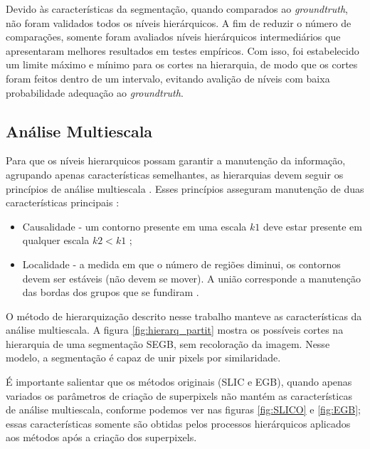 \begin{document}
Devido às características da segmentação, quando comparados ao \textit{groundtruth}, não foram validados todos os níveis hierárquicos. A fim de reduzir o número de comparações, somente foram avaliados níveis hierárquicos intermediários que apresentaram melhores resultados em testes empíricos. Com isso, foi estabelecido um limite máximo e mínimo para os cortes na hierarquia, de modo que os cortes foram feitos dentro de um intervalo, evitando avalição de níveis com baixa probabilidade adequação ao \textit{groundtruth}.


\subsection{Análise Multiescala} \label{ssec:analise_multiescala}

Para que os níveis hierarquicos possam garantir a manutenção da informação, agrupando apenas características semelhantes, as hierarquias devem seguir os princípios de análise multiescala \cite{SILVIO_ZENILTON}. Esses princípios asseguram manutenção de duas características principais \cite{SILVIO_ZENILTON}:

\begin{itemize}
 \item Causalidade - um contorno presente em uma escala $k1$ deve estar presente em qualquer escala $k2 < k1$ \cite{SILVIO_ZENILTON};
 \item Localidade - a medida em que o número de regiões diminui, os contornos devem ser estáveis (não devem se mover). A união corresponde a manutenção das bordas dos grupos que se fundiram \cite{SILVIO_ZENILTON}.
\end{itemize}

O método de hierarquização descrito nesse trabalho manteve as características da análise multiescala. A figura \ref{fig:hierarq_partit} mostra os possíveis cortes na hierarquia de uma segmentação SEGB, sem recoloração da imagem. Nesse modelo, a segmentação é capaz de unir pixels por similaridade.

É importante salientar que os métodos originais (SLIC e EGB), quando apenas variados os parâmetros de criação de superpixels não mantém as características de análise multiescala, conforme podemos ver nas figuras \ref{fig:SLICO} e \ref{fig:EGB}; essas características somente são obtidas pelos processos hierárquicos aplicados aos métodos após a criação dos superpixels.
\end{document}
